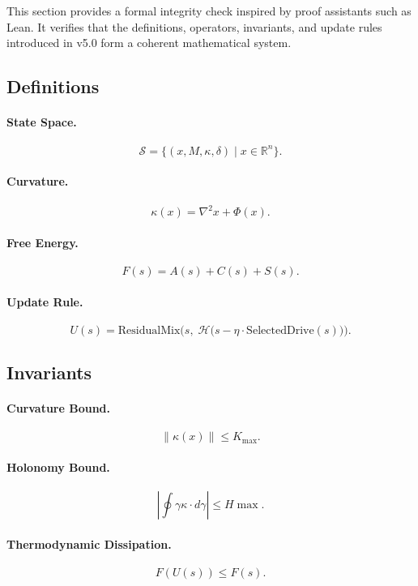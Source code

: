 This section provides a formal integrity check inspired by proof assistants such
as Lean. It verifies that the definitions, operators, invariants, and update
rules introduced in v5.0 form a coherent mathematical system.

\subsection{Definitions}

\paragraph{State Space.}
\[
\mathcal{S} = \{ (x, M, \kappa, \delta) \mid x \in \mathbb{R}^n \}.
\]

\paragraph{Curvature.}
\[
\kappa(x) = \nabla^2 x + \Phi(x).
\]

\paragraph{Free Energy.}
\[
F(s) = A(s) + C(s) + S(s).
\]

\paragraph{Update Rule.}
\[
U(s) =
\mathrm{ResidualMix}\Big(
    s,\;
    \mathcal{H}\big(
        s - \eta \cdot \mathrm{SelectedDrive}(s)
    \big)
\Big).
\]

\subsection{Invariants}

\paragraph{Curvature Bound.}
\[
\|\kappa(x)\| \le K_{\max}.
\]

\paragraph{Holonomy Bound.}
\[
\left|\oint{\gamma} \kappa \cdot d\gamma\right| \le H{\max}.
\]

\paragraph{Thermodynamic Dissipation.}
\[
F(U(s)) \le F(s).
\]

